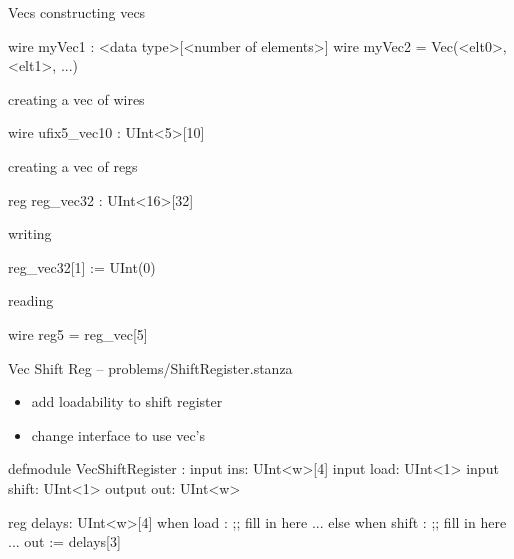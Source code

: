 \documentclass[xcolor=pdflatex,dvipsnames,table]{beamer}
\begin{document}
\begin{frame}[fragile]{Vecs}
constructing vecs
\begin{stanza}
wire myVec1 : <data type>[<number of elements>]
wire myVec2 = Vec(<elt0>, <elt1>, ...)
\end{stanza}

creating a vec of wires
\begin{stanza}
wire ufix5_vec10 : UInt<5>[10]
\end{stanza}


creating a vec of regs
\begin{stanza}
reg reg_vec32 : UInt<16>[32]
\end{stanza}

writing
\begin{stanza}
reg_vec32[1] := UInt(0)
\end{stanza}

reading
\begin{stanza}
wire reg5 = reg_vec[5]
\end{stanza}

\end{frame}

\begin{frame}[fragile]{Vec Shift Reg -- {\tiny problems/ShiftRegister.stanza}}

\begin{itemize}
\item add loadability to shift register
\item change interface to use vec's
\end{itemize}

{
\begin{stanza}
defmodule VecShiftRegister :
  input ins: UInt<w>[4]
  input load: UInt<1>
  input shift: UInt<1>
  output out: UInt<w>

  reg delays: UInt<w>[4]
  when load :
    ;; fill in here ...
  else when shift :
    ;; fill in here ...
  out := delays[3]    
\end{stanza}
}

\end{frame}

\end{document}
